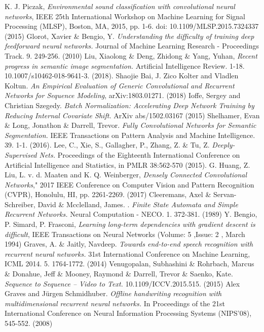 \documentclass[a4paper,11pt,twoside]{report}
\theoremstyle{definition}
\begin{document}
\begin{thebibliography}{49}
 K. J. Piczak, \emph{Environmental sound classification with convolutional neural networks}, IEEE 25th International Workshop on Machine Learning for Signal Processing (MLSP), Boston, MA, 2015, pp. 1-6. doi: 10.1109/MLSP.2015.7324337 (2015)
Glorot, Xavier \& Bengio, Y. \emph{Understanding the difficulty of training deep feedforward neural networks.} Journal of Machine Learning Research - Proceedings Track. 9. 249-256. (2010)
 Liu, Xiaolong \& Deng, Zhidong \& Yang, Yuhan, \emph{Recent progress in semantic image segmentation.} Artificial Intelligence Review. 1-18. 10.1007/s10462-018-9641-3. (2018).
 Shaojie Bai, J. Zico Kolter and Vladlen Koltun. \emph{An Empirical Evaluation of Generic Convolutional and Recurrent Networks for Sequence Modeling}, arXiv:1803.01271. (2018)
Ioffe, Sergey and Christian Szegedy. \emph{Batch Normalization: Accelerating Deep Network Training by Reducing Internal Covariate Shift.} ArXiv abs/1502.03167 (2015)
Shelhamer, Evan \& Long, Jonathon \& Darrell, Trevor. \emph{Fully Convolutional Networks for Semantic Segmentation.} IEEE Transactions on Pattern Analysis and Machine Intelligence. 39. 1-1. (2016).
Lee, C., Xie, S., Gallagher, P., Zhang, Z. \& Tu, Z. \emph{Deeply-Supervised Nets.} Proceedings of the Eighteenth International Conference on Artificial Intelligence and Statistics, in PMLR 38:562-570 (2015).
G. Huang, Z. Liu, L. v. d. Maaten and K. Q. Weinberger, \emph{Densely Connected Convolutional Networks}," 2017 IEEE Conference on Computer Vision and Pattern Recognition (CVPR), Honolulu, HI, pp. 2261-2269. (2017)
 Cleeremans, Axel \& Servan-Schreiber, David \& Mcclelland, James. . \emph{Finite State Automata and Simple Recurrent Networks.} Neural Computation - NECO. 1. 372-381. (1989) 
 Y. Bengio, P. Simard, P. Frasconi, \emph{Learning long-term dependencies with gradient descent is difficult}, IEEE Transactions on Neural Networks (Volume: 5 ,Issue: 2 , March 1994)
Graves, A. \& Jaitly, Navdeep. \emph{Towards end-to-end speech recognition with recurrent neural networks.} 31st International Conference on Machine Learning, ICML 2014. 5. 1764-1772. (2014)
 Venugopalan, Subhashini \& Rohrbach, Marcus \& Donahue, Jeff \& Mooney, Raymond \& Darrell, Trevor \& Saenko, Kate. \emph{Sequence to Sequence -- Video to Text.} 10.1109/ICCV.2015.515. (2015)
 Alex Graves and Jürgen Schmidhuber. \emph{Offline handwriting recognition with multidimensional recurrent neural networks.} In Proceedings of the 21st International Conference on Neural Information Processing Systems (NIPS'08), 545-552.  (2008)  

\end{thebibliography}
\end{document}
